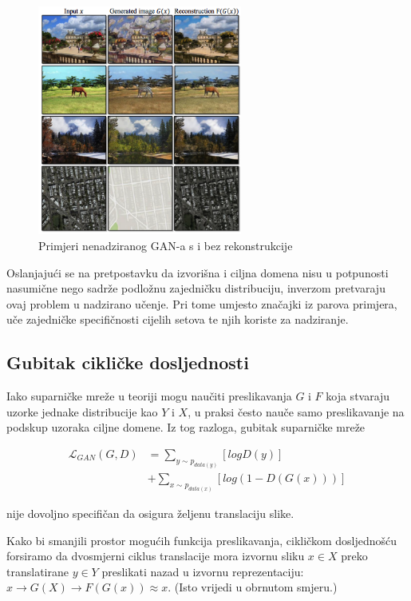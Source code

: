 \documentclass[lmodern, utf8, seminar]{fer}
\newcommand{\Lagr}{\mathcal{L}}
\begin{document}
\begin{figure}[H]
    \centering
    \includegraphics[width=0.6\textwidth]{zhu2017unpaired-reconstruction}
    \caption{Primjeri nenadziranog GAN-a s i bez rekonstrukcije}
    \label{fig:zhu2017unpaired-reconstruction}
\end{figure}

Oslanjajući se na pretpostavku da izvorišna i ciljna domena nisu u potpunosti nasumične nego sadrže podložnu zajedničku distribuciju, inverzom pretvaraju ovaj problem u nadzirano učenje. Pri tome umjesto značajki iz parova primjera, uče zajedničke specifičnosti cijelih setova te njih koriste za nadziranje.

\subsection{Gubitak cikličke dosljednosti}
Iako suparničke mreže u teoriji mogu naučiti preslikavanja $G$ i $F$ koja stvaraju uzorke jednake distribucije kao $Y$ i $X$, u praksi često nauče samo preslikavanje na podskup uzoraka ciljne domene. Iz tog razloga, gubitak suparničke mreže 


\begin{equation}
\begin{split}
\Lagr_{GAN}(G, D) &= \sum_{y\sim p_{data(y)}}[log D(y)] \\
			     &+ \sum_{x\sim p_{data(x)}}[log(1 - D(G(x)))]
\end{split}
\end{equation}

nije dovoljno specifičan da osigura željenu translaciju slike.
\newline

Kako bi smanjili prostor mogućih funkcija preslikavanja, cikličkom dosljednošću forsiramo da dvosmjerni ciklus translacije mora izvornu sliku $x \in X$ preko translatirane $y \in Y$ preslikati nazad u izvornu reprezentaciju: $x \rightarrow G(X) \rightarrow F(G(x)) \approx x$. (Isto vrijedi u obrnutom smjeru.)
\end{document}
